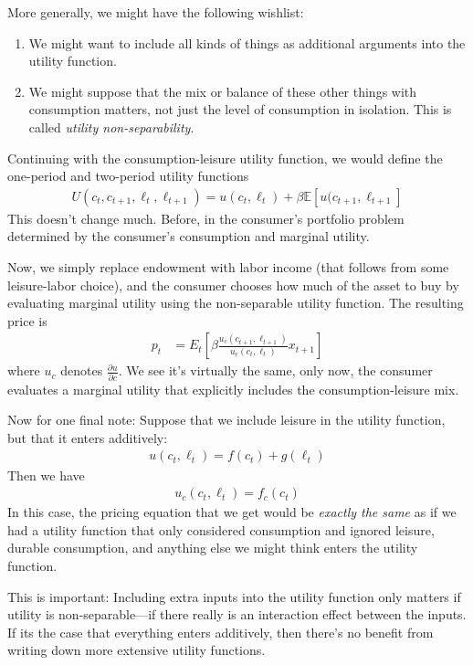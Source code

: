 \documentclass[12pt]{article}
\theoremstyle{plain}
\theoremstyle{definition}
\theoremstyle{remark}
\begin{document}
More generally, we might have the following wishlist:
\begin{enumerate}
  \item We might want to include all kinds of things as additional
    arguments into the utility function.
  \item We might suppose that the mix or balance of these other things
    with consumption matters, not just the level of consumption in
    isolation. This is called \emph{utility non-separability}.
\end{enumerate}
Continuing with the consumption-leisure utility function, we would
define the one-period and two-period utility functions
\begin{align*}
  U(c_t,c_{t+1},\ell_t,\ell_{t+1})
  =
  u(c_t,\ell_t) + \beta \mathbb{E}[u(c_{t+1},\ell_{t+1}]
\end{align*}
This doesn't change much. Before, in the consumer's portfolio problem
determined by the consumer's consumption and marginal utility.

Now, we simply replace endowment with labor income (that follows from
some leisure-labor choice), and the consumer chooses how much of the
asset to buy by evaluating marginal utility using the non-separable
utility function. The resulting price is
\begin{align}
    p_t &= E_t\left[
  \beta\frac{u_c(c_{t+1},\ell_{t+1})}{u_c(c_{t},\ell_t)} x_{t+1} \right]
  \label{nonsep}
\end{align}
where $u_c$ denotes $\frac{\partial u}{\partial c}$. We see it's
virtually the same, only now, the consumer evaluates a marginal utility
that explicitly includes the consumption-leisure mix.

Now for one final note: Suppose that we include leisure in the utility function, but that it enters additively:
\begin{align*}
  u(c_t,\ell_t) = f(c_t) + g(\ell_t)
\end{align*}
Then we have
\begin{align*}
  u_c(c_t,\ell_t) = f_c(c_t)
\end{align*}
In this case, the pricing equation that we get would be \emph{exactly
the same} as if we had a utility function that only considered
consumption and ignored leisure, durable consumption, and anything else
we might think enters the utility function.

This is important: Including extra inputs into the utility function only
matters if utility is non-separable---if there really is an interaction
effect between the inputs. If its the case that everything enters
additively, then there's no benefit from writing down more extensive
utility functions.
\end{document}
